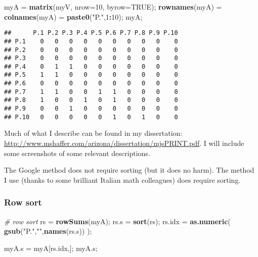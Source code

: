 \documentclass[
]{article}
\newenvironment{Shaded}{\begin{snugshade}}{\end{snugshade}}
\newcommand{\CommentTok}[1]{\textcolor[rgb]{0.56,0.35,0.01}{\textit{#1}}}
\newcommand{\DataTypeTok}[1]{\textcolor[rgb]{0.13,0.29,0.53}{#1}}
\newcommand{\DecValTok}[1]{\textcolor[rgb]{0.00,0.00,0.81}{#1}}
\newcommand{\KeywordTok}[1]{\textcolor[rgb]{0.13,0.29,0.53}{\textbf{#1}}}
\newcommand{\NormalTok}[1]{#1}
\newcommand{\OperatorTok}[1]{\textcolor[rgb]{0.81,0.36,0.00}{\textbf{#1}}}
\newcommand{\OtherTok}[1]{\textcolor[rgb]{0.56,0.35,0.01}{#1}}
\newcommand{\StringTok}[1]{\textcolor[rgb]{0.31,0.60,0.02}{#1}}
\begin{document}
\begin{Shaded}
\begin{Highlighting}[]
\NormalTok{myA =}\StringTok{ }\KeywordTok{matrix}\NormalTok{(myV, }\DataTypeTok{nrow=}\DecValTok{10}\NormalTok{, }\DataTypeTok{byrow=}\OtherTok{TRUE}\NormalTok{);}
  \KeywordTok{rownames}\NormalTok{(myA) =}\StringTok{ }\KeywordTok{colnames}\NormalTok{(myA) =}\StringTok{ }\KeywordTok{paste0}\NormalTok{(}\StringTok{"P."}\NormalTok{,}\DecValTok{1}\OperatorTok{:}\DecValTok{10}\NormalTok{);}
\NormalTok{myA;}
\end{Highlighting}
\end{Shaded}

\begin{verbatim}
##      P.1 P.2 P.3 P.4 P.5 P.6 P.7 P.8 P.9 P.10
## P.1    0   0   0   0   0   0   0   0   0    0
## P.2    0   0   0   0   0   0   0   0   0    0
## P.3    0   0   0   0   0   0   0   0   0    0
## P.4    0   1   1   0   0   0   0   0   0    0
## P.5    1   1   0   0   0   0   0   0   0    0
## P.6    0   0   0   0   0   0   0   0   0    0
## P.7    1   1   0   0   1   1   0   0   0    0
## P.8    1   0   0   1   0   1   0   0   0    0
## P.9    0   0   1   0   0   0   0   0   0    0
## P.10   0   0   0   0   0   1   0   1   0    0
\end{verbatim}

Much of what I describe can be found in my dissertation:
\url{http://www.mshaffer.com/arizona/dissertation/mjsPRINT.pdf}. I will
include some screenshots of some relevant descriptions.

The Google method does not require sorting (but it does no harm). The
method I use (thanks to some brilliant Italian math colleagues) does
require sorting.

\hypertarget{row-sort}{%
\subsubsection{Row sort}\label{row-sort}}

\begin{Shaded}
\begin{Highlighting}[]
\CommentTok{\# row sort}
\NormalTok{rs =}\StringTok{ }\KeywordTok{rowSums}\NormalTok{(myA);}
\NormalTok{rs.s =}\StringTok{ }\KeywordTok{sort}\NormalTok{(rs);}
\NormalTok{rs.idx =}\StringTok{ }\KeywordTok{as.numeric}\NormalTok{( }\KeywordTok{gsub}\NormalTok{(}\StringTok{"P."}\NormalTok{,}\StringTok{""}\NormalTok{,}\KeywordTok{names}\NormalTok{(rs.s)) );}

\NormalTok{myA.s =}\StringTok{ }\NormalTok{myA[rs.idx,];}
\NormalTok{myA.s;}
\end{Highlighting}
\end{Shaded}
\end{document}
